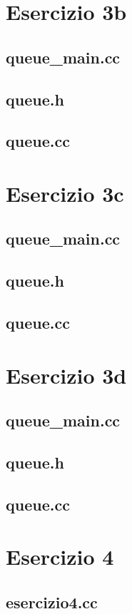 \documentclass[fleqn,italian]{scrartcl}
\begin{document}
\section*{Esercizio 3b}

\newpage
\subsection*{{queue\_main.cc}}

\subsection*{{queue.h}}

\subsection*{{queue.cc}}

\newpage

\section*{Esercizio 3c}

\newpage
\subsection*{{queue\_main.cc}}

\subsection*{{queue.h}}

\subsection*{{queue.cc}}

\newpage

\section*{Esercizio 3d}

\newpage
\subsection*{{queue\_main.cc}}

\subsection*{{queue.h}}

\subsection*{{queue.cc}}

\newpage

\section*{Esercizio 4}

\newpage
\subsection*{{esercizio4.cc}}

\end{document}
